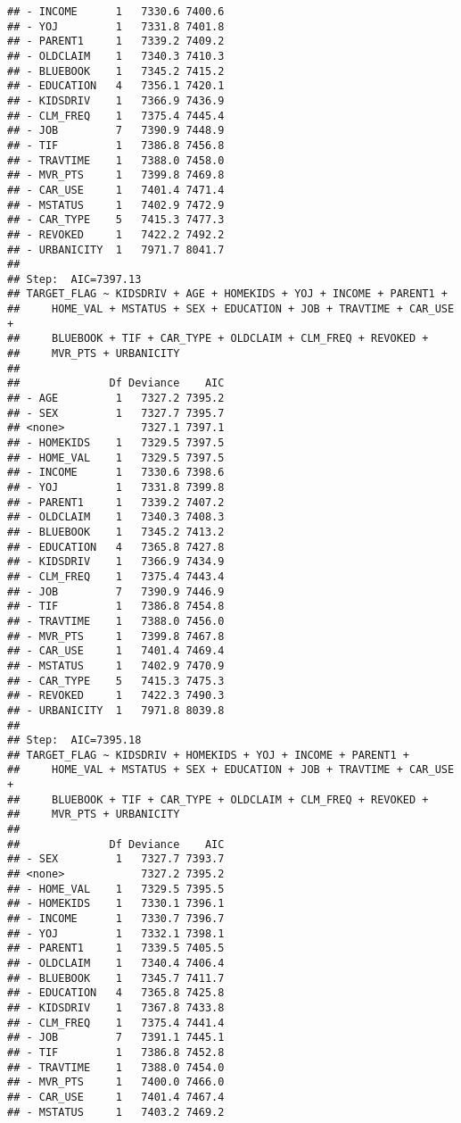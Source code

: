 \documentclass[]{article}
\begin{document}
\begin{verbatim}
## - INCOME      1   7330.6 7400.6
## - YOJ         1   7331.8 7401.8
## - PARENT1     1   7339.2 7409.2
## - OLDCLAIM    1   7340.3 7410.3
## - BLUEBOOK    1   7345.2 7415.2
## - EDUCATION   4   7356.1 7420.1
## - KIDSDRIV    1   7366.9 7436.9
## - CLM_FREQ    1   7375.4 7445.4
## - JOB         7   7390.9 7448.9
## - TIF         1   7386.8 7456.8
## - TRAVTIME    1   7388.0 7458.0
## - MVR_PTS     1   7399.8 7469.8
## - CAR_USE     1   7401.4 7471.4
## - MSTATUS     1   7402.9 7472.9
## - CAR_TYPE    5   7415.3 7477.3
## - REVOKED     1   7422.2 7492.2
## - URBANICITY  1   7971.7 8041.7
## 
## Step:  AIC=7397.13
## TARGET_FLAG ~ KIDSDRIV + AGE + HOMEKIDS + YOJ + INCOME + PARENT1 + 
##     HOME_VAL + MSTATUS + SEX + EDUCATION + JOB + TRAVTIME + CAR_USE + 
##     BLUEBOOK + TIF + CAR_TYPE + OLDCLAIM + CLM_FREQ + REVOKED + 
##     MVR_PTS + URBANICITY
## 
##              Df Deviance    AIC
## - AGE         1   7327.2 7395.2
## - SEX         1   7327.7 7395.7
## <none>            7327.1 7397.1
## - HOMEKIDS    1   7329.5 7397.5
## - HOME_VAL    1   7329.5 7397.5
## - INCOME      1   7330.6 7398.6
## - YOJ         1   7331.8 7399.8
## - PARENT1     1   7339.2 7407.2
## - OLDCLAIM    1   7340.3 7408.3
## - BLUEBOOK    1   7345.2 7413.2
## - EDUCATION   4   7365.8 7427.8
## - KIDSDRIV    1   7366.9 7434.9
## - CLM_FREQ    1   7375.4 7443.4
## - JOB         7   7390.9 7446.9
## - TIF         1   7386.8 7454.8
## - TRAVTIME    1   7388.0 7456.0
## - MVR_PTS     1   7399.8 7467.8
## - CAR_USE     1   7401.4 7469.4
## - MSTATUS     1   7402.9 7470.9
## - CAR_TYPE    5   7415.3 7475.3
## - REVOKED     1   7422.3 7490.3
## - URBANICITY  1   7971.8 8039.8
## 
## Step:  AIC=7395.18
## TARGET_FLAG ~ KIDSDRIV + HOMEKIDS + YOJ + INCOME + PARENT1 + 
##     HOME_VAL + MSTATUS + SEX + EDUCATION + JOB + TRAVTIME + CAR_USE + 
##     BLUEBOOK + TIF + CAR_TYPE + OLDCLAIM + CLM_FREQ + REVOKED + 
##     MVR_PTS + URBANICITY
## 
##              Df Deviance    AIC
## - SEX         1   7327.7 7393.7
## <none>            7327.2 7395.2
## - HOME_VAL    1   7329.5 7395.5
## - HOMEKIDS    1   7330.1 7396.1
## - INCOME      1   7330.7 7396.7
## - YOJ         1   7332.1 7398.1
## - PARENT1     1   7339.5 7405.5
## - OLDCLAIM    1   7340.4 7406.4
## - BLUEBOOK    1   7345.7 7411.7
## - EDUCATION   4   7365.8 7425.8
## - KIDSDRIV    1   7367.8 7433.8
## - CLM_FREQ    1   7375.4 7441.4
## - JOB         7   7391.1 7445.1
## - TIF         1   7386.8 7452.8
## - TRAVTIME    1   7388.0 7454.0
## - MVR_PTS     1   7400.0 7466.0
## - CAR_USE     1   7401.4 7467.4
## - MSTATUS     1   7403.2 7469.2

\end{verbatim}
\end{document}
